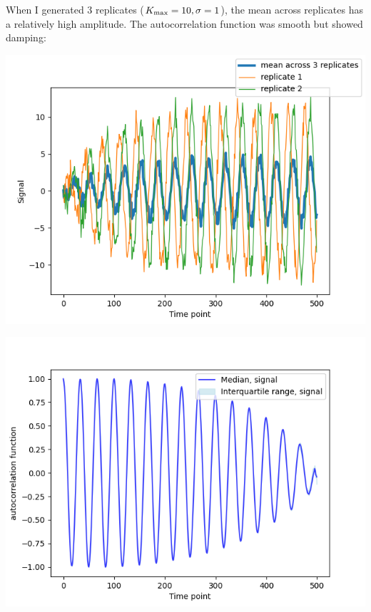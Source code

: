 \begin{enumerate}
\begin{enumerate}
\begin{enumerate}
When I generated 3 replicates (\(K_{\rm{max}} = 10, \sigma = 1\)), the mean across replicates has a relatively high amplitude.  The autocorrelation function was smooth but showed damping:
\begin{center}
\includegraphics[width=.9\linewidth]{nonstat_kmax10_randphase_3rep_mean.png}
\end{center}
\begin{center}
\includegraphics[width=.9\linewidth]{nonstat_kmax10_randphase_3rep_acf.png}
\end{center}


\end{enumerate}
\end{enumerate}
\end{enumerate}
